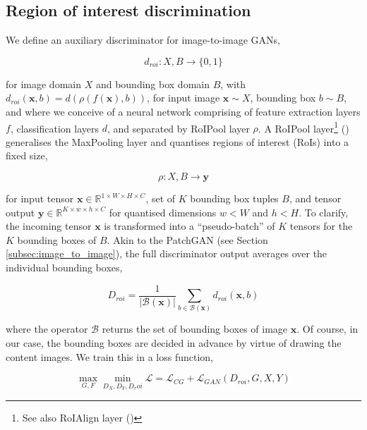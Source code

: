 \subsection{Region of interest discrimination}

We define an auxiliary discriminator for image-to-image GANs,

\begin{equation}
d_{roi} : X, B \to \{0, 1\}
\end{equation}

for image domain $X$ and bounding box domain $B$, with $d_{roi}(\mathbf{x}, b) = d(\rho(f(\mathbf{x}), b))$, for input image $\mathbf{x} \sim X$, bounding box $b \sim B$, and where we conceive of a neural network comprising of feature extraction layers $f$, classification layers $d$, and separated by RoIPool layer $\rho$. A RoIPool layer\footnote{See also RoIAlign layer (\cite{he2017mask})} (\cite{girshick2015fast}) generalises the MaxPooling layer and quantises regions of interest (RoIs) into a fixed size,

\begin{equation}
\rho : X, B \to \mathbf{y}
\end{equation}

for input tensor $\mathbf{x} \in \mathbb{R}^{1\times W \times H \times C}$, set of $K$ bounding box tuples $B$, and tensor output $\mathbf{y} \in \mathbb{R}^{K \times w \times h \times C}$ for quantised dimensions $w < W$ and $h < H$. To clarify, the incoming tensor $\mathbf{x}$ is transformed into a ``pseudo-batch'' of $K$ tensors for the $K$ bounding boxes of $B$. Akin to the PatchGAN (see Section \ref{subsec:image_to_image}), the full discriminator output averages over the individual bounding boxes,

\begin{equation}
D_{roi} = \frac{1}{|\mathcal{B}(\mathbf{x})|}\sum_{b \in \mathcal{B}(\mathbf{x})} d_{roi}(\mathbf{x}, b)
\end{equation}

where the operator $\mathcal{B}$ returns the set of bounding boxes of image $\mathbf{x}$. Of course, in our case, the bounding boxes are decided in advance by virtue of drawing the content images. We train this in a loss function,

\begin{equation}
\max_{G, F}\min_{D_X, D_Y, D_roi}\mathcal{L} = \mathcal{L}_{CG} + \mathcal{L}_{GAN}(D_{roi}, G, X, Y)
\end{equation}

